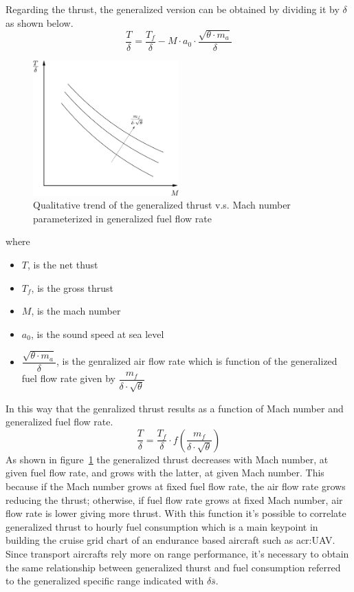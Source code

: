 \bigskip
\noindent
Regarding the thrust, the generalized version can be obtained by dividing it by $\delta$ as shown below.
\begin{equation}
\frac{T}{\delta}=\frac{T_{f}}{\delta}-M\cdot a_{0}\cdot \frac{\sqrt{\theta \cdot m_{a}}}{\delta}
\label{eqn:Equation1}
\end{equation}
%
\begin{figure}[!ht]
\centering
\includegraphics[keepaspectratio, width=0.50\textwidth]{TDelta}
\caption{Qualitative trend of  the generalized thrust v.s. Mach number parameterized in generalized fuel flow rate}
\label{fig:Figure1}
\end{figure}
%
where
%
\begin{itemize}
\item $T$, is the net thust
\item $T_{f}$, is the gross thrust
\item $M$, is the mach number
\item $a_{0}$, is the sound speed at sea level
\item $\dfrac{\sqrt{\theta \cdot m_{a}}}{\delta}$, is the genralized air flow rate which is function of the generalized fuel flow rate given by $\dfrac{m_{f}}{\delta \cdot \sqrt{\theta}}$
\end{itemize}
%
\noindent
In this way that the genralized thrust results as a function of Mach number and generalized fuel flow rate.
%
\begin{equation}
\frac{T}{\delta}=\frac{T_{f}}{\delta}\cdot f\left(\frac{m_{f}}{\delta \cdot \sqrt{\theta}}\right)
\label{eqn:Equation2}
\end{equation}
%
\noindent
As shown in figure~\ref{fig:Figure1} the generalized thrust decreases with Mach number, at given fuel flow rate, and grows with the latter, at given Mach number. This because if the Mach number grows at fixed fuel flow rate, the air flow rate grows reducing the thrust; otherwise, if fuel flow rate grows at fixed Mach number, air flow rate is lower giving more thrust.
%
With this function it's possible to correlate generalized thrust to hourly fuel consumption which is a main keypoint in building the cruise grid chart of an endurance based aircraft such as \gls{acr:UAV}. 
%
Since transport aircrafts rely more on range performance, it's necessary to obtain the same relationship between generalized thurst and fuel consumption referred to the generalized specific range indicated with $\delta\bar s $. 

